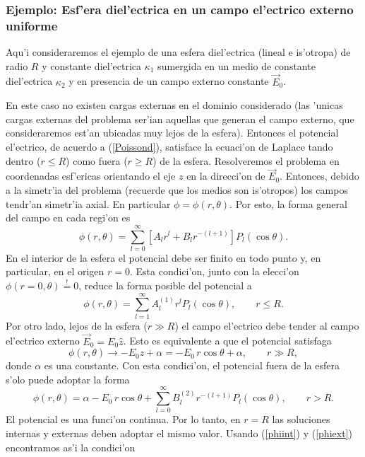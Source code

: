\subsubsection{Ejemplo: Esf'era diel'ectrica en un campo el'ectrico externo uniforme}
Aqu'i consideraremos el ejemplo de una esfera diel'ectrica (lineal e is'otropa) de radio $R$ y constante diel'ectrica $\kappa_1$ sumergida en un medio de constante diel'ectrica $\kappa_2$ y en presencia de un campo externo constante $\vec{E}_0$.

En este caso no existen cargas externas en el dominio considerado (las 'unicas cargas externas del problema ser'ian aquellas que generan el campo externo, que consideraremos est'an ubicadas muy lejos de la esfera). Entonces el potencial el'ectrico, de acuerdo a (\ref{Poissond}), satisface la ecuaci'on de Laplace tando dentro ($r\le R$) como fuera ($r\ge R$) de la esfera. Resolveremos el problema en coordenadas esf'ericas orientando el eje $z$ en la direcci'on de $\vec{E}_0$. Entonces, debido a la simetr'ia del problema (recuerde que los medios son is'otropos) los campos tendr'an simetr'ia axial. En particular $\phi=\phi(r,\theta)$. Por esto, la forma general del campo en cada regi'on es
 \begin{equation}
 \phi(r,\theta)=\sum_{l=0}^{\infty}\left[  A_lr^{l}+B_lr^{-(l+1)}\right]
 P_l(\cos\theta).
 \end{equation}
En el interior de la esfera el potencial debe ser finito en todo punto y, en particular, en el origen $r=0$. Esta condici'on, junto con la elecci'on $\phi (r=0,\theta)\stackrel{!}{=}0$, reduce la forma posible del potencial a 
 \begin{equation}\label{phiint}
 \phi(r,\theta)=\sum_{l=1}^{\infty}A_l^{(1)}r^{l}P_l(\cos\theta), \qquad r\le R.
 \end{equation}
Por otro lado, lejos de la esfera ($r\gg R$) el campo el'ectrico debe tender al campo el'ectrico externo $\vec{E}_0=E_0\hat{z}$. Esto es equivalente a que el potencial satisfaga
\begin{equation}
 \phi(r,\theta)\to -E_0z+\alpha = -E_0\,r\cos\theta+\alpha, \qquad r\gg R,
\end{equation}
donde $\alpha$ es una constante. Con esta condici'on, el potencial fuera de la esfera s'olo puede adoptar la forma
\begin{equation}\label{phiext}
\phi(r,\theta)=\alpha-E_0\,r\cos\theta+\sum_{l=0}^{\infty}B_l^{(2)}
 r^{-(l+1)}P_l(\cos\theta), \qquad r>R.
\end{equation}
El potencial es una funci'on continua. Por lo tanto, en $r=R$ las soluciones internas y externas deben adoptar el mismo valor. Usando (\ref{phiint}) y (\ref{phiext}) encontramos as'i la condici'on
